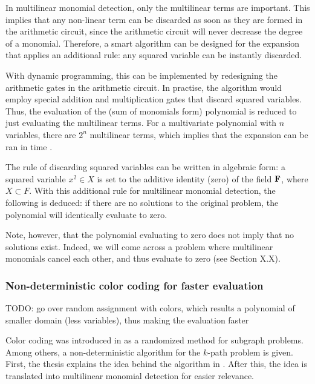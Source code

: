 In multilinear monomial detection, only the multilinear terms are important. This implies that any non-linear term can be discarded 
as soon as they are formed in the arithmetic circuit, since the arithmetic circuit will never decrease the degree of a monomial. 
Therefore, a smart algorithm can be designed for the expansion that applies an additional rule: 
any squared variable can be instantly discarded.\nl

With dynamic programming, this can be implemented by redesigning the arithmetic gates in the arithmetic circuit. 
In practise, the algorithm would employ special addition and multiplication gates that discard squared variables. 
Thus, the evaluation of the (sum of monomials form) polynomial is reduced to just evaluating the multilinear terms. 
For a multivariate polynomial with $n$ variables, there are $2^n$ multilinear terms, which implies 
that the expansion can be ran in  time \cite{KouWil15}.\nl

The rule of discarding squared variables can be written in algebraic form: 
a squared variable $x^2 \in X$ is set to the additive identity (zero) of the field $\textbf F$, 
where $X \subset F$. 
With this additional rule for multilinear monomial detection, the following is deduced: 
if there are no solutions to the original problem, 
the polynomial will identically evaluate to zero.\nl

Note, however, that the polynomial evaluating to zero does not imply that no solutions exist. 
Indeed, we will come across a problem where multilinear monomials cancel each other, 
and thus evaluate to zero (see Section X.X).

\subsubsection{Non-deterministic color coding for faster evaluation}

TODO: go over random assignment with colors, 
which results a polynomial of smaller domain (less variables), thus 
making the evaluation faster

Color coding was introduced in \cite{Alon95} as a randomized method for subgraph problems. Among others, 
a non-deterministic algorithm for the $k$-path problem is given.
First, the thesis explains the idea behind the algorithm in \cite{Alon95}. 
After this, the idea is translated into multilinear monomial detection for easier relevance.

\begin{problem}
\end{problem}

